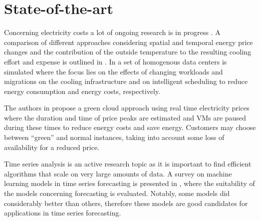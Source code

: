 \documentclass[a4paper]{article}
\begin{document}


\section{State-of-the-art}

Concerning electricity costs a lot of ongoing research is in progress \cite{guler2013cutting, le2011reducing}. A comparison of different approaches considering spatial and temporal energy price changes and the contribution of the outside temperature to the resulting cooling effort and expense is outlined in \cite{guler2013cutting}. In \cite{le2011reducing} a set of homogenous data centers is simulated where the focus lies on the effects of changing workloads and migrations on the cooling infrastructure and on intelligent scheduling to reduce energy consumption and energy costs, respectively. 


The authors in \cite{lucanin2013take} propose a green cloud approach using real time electricity prices where the duration and time of price peaks are estimated and VMs are paused during these times to reduce energy costs and save energy. Customers may choose between ``green'' and normal instances, taking into account some loss of availability for a reduced price. 

Time series analysis is an active research topic as it is important to find efficient algorithms that scale on very large amounts of data. A survey on machine learning models in time series forecasting is presented in \cite{ahmed2010empirical}, where the suitability of the models concerning forecasting is evaluated. Notably, some models did considerably better than others, therefore these models are good candidates for applications in time series forecasting. 
\end{document}
